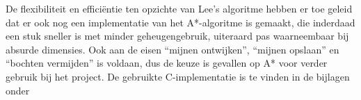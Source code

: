 \documentclass{report}
\begin{document}
\noindent
De flexibiliteit en efficiëntie ten opzichte van Lee's algoritme hebben er toe geleid dat er ook nog een implementatie van het A*-algoritme is gemaakt, die inderdaad een stuk sneller is met minder geheugengebruik, uiteraard pas waarneembaar bij absurde dimensies. Ook aan de eisen ``mijnen ontwijken'', ``mijnen opslaan'' en ``bochten vermijden'' is voldaan, dus de keuze is gevallen op A* voor verder gebruik bij het project. De gebruikte C-implementatie is te vinden in de bijlagen onder \cite{sec:code-navigation}
\end{document}

